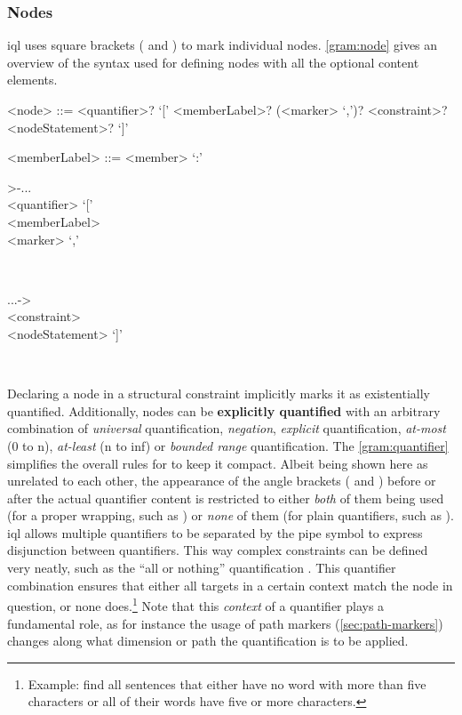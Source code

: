 \documentclass[11pt,a4paper]{report}
\begin{document}
\subsubsection{Nodes}
\label{sec:nodes}
\ac{iql} uses square brackets (\lit{[} and \lit{]}) to mark individual nodes.
\cref{gram:node} gives an overview of the syntax used for defining nodes with all the optional content elements.
\begin{gram}
	\label{gram:node}
	\begin{grammar}			
		<node> ::= <quantifier>? `[' <memberLabel>? (<marker> `,')? <constraint>? <nodeStatement>? `]'
		
		<memberLabel> ::= <member> `:'
	\end{grammar}
	\diagsep
	\noindent\begin{rrfrag}{>-}{...}
		\sst \\ <quantifier> \est `[' 
		\sst \\ <memberLabel> \est
		\sst \\ <marker> `,' \est
	\end{rrfrag}\\
	\begin{rrfrag}{...}{->}
		\sst \\ <constraint> \est
		\sst \\ <nodeStatement> \est `]'
	\end{rrfrag}\\
\end{gram}
Declaring a node in a structural constraint implicitly marks it as existentially quantified.
Additionally, nodes can be \textbf{explicitly quantified} with an arbitrary combination of \textit{universal} quantification, \textit{negation}, \textit{explicit} quantification, \textit{at-most} (0 to n), \textit{at-least} (n to inf) or \textit{bounded range} quantification. 
The \cref{gram:quantifier} simplifies the overall rules for  to keep it compact.
Albeit being shown here as unrelated to each other, the appearance of the angle brackets (\lit{\textless} and \lit{\textgreater}) before or after the actual quantifier content is restricted to either \textit{both} of them being used (for a proper wrapping, such as ) or \textit{none} of them (for plain quantifiers, such as ).
\ac{iql} allows multiple quantifiers to be separated by the pipe symbol \lit{|} to express disjunction between quantifiers.
This way complex constraints can be defined very neatly, such as the ``all or nothing'' quantification .
This quantifier combination ensures that either all targets in a certain context match the node in question, or none does.\footnote{Example: find all sentences that either have no word with more than five characters or all of their words have five or more characters.}
Note that this \textit{context} of a quantifier plays a fundamental role, as for instance the usage of path markers (\ref{sec:path-markers}) changes along what dimension or path the quantification is to be applied.
\end{document}
